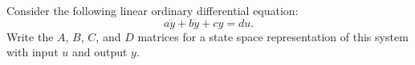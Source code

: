 \begin{question}
    Consider the following linear ordinary differential equation:
    \begin{equation*}
        a \ddot{y} + b \dot{y} + c y = d u \text{.}
    \end{equation*}
    Write the $A$, $B$, $C$, and $D$ matrices for a state space representation of this system with input $u$ and output $y$.
\end{question}
